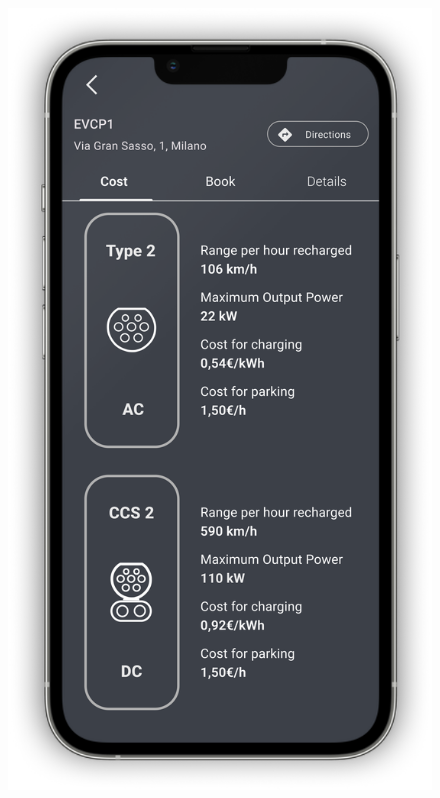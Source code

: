 \begin{figure}[H]
{        \includegraphics[scale=0.32]{src/mockups/book_cost.png}
    }
    \newline
\end{figure}
